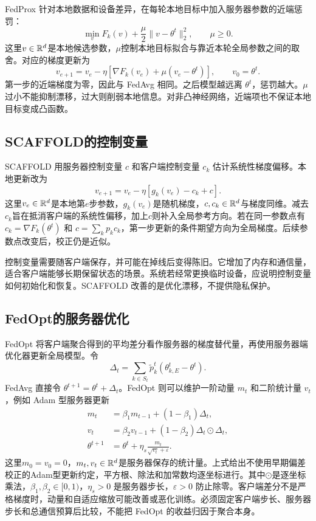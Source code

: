 FedProx 针对本地数据和设备差异，在每轮本地目标中加入服务器参数的近端惩罚\cite{li2020fedprox}：
\begin{equation}
 \min_v F_k(v)+\frac{\mu}{2}\|v-\theta^t\|_2^2,
 \qquad \mu\geq0.
 \label{eq:fedprox-objective-rewrite}
\end{equation}
这里$v\in\mathbb{R}^d$是本地候选参数，$\mu$控制本地目标拟合与靠近本轮全局参数之间的取舍。对应的梯度更新为
\begin{equation}
 v_{e+1}=v_e-\eta[\nabla F_k(v_e)+\mu(v_e-\theta^t)],
 \qquad v_0=\theta^t.
\end{equation}
第一步的近端梯度为零，因此与 FedAvg 相同。之后模型越远离 $\theta^t$，惩罚越大。$\mu$ 过小不能抑制漂移，过大则削弱本地信息。对非凸神经网络，近端项也不保证本地目标变成凸函数。

\subsection{SCAFFOLD的控制变量}

SCAFFOLD 用服务器控制变量 $c$ 和客户端控制变量 $c_k$ 估计系统性梯度偏移\cite{karimireddy2020scaffold}。本地更新改为
\begin{equation}
 v_{e+1}=v_e-\eta[g_k(v_e)-c_k+c].
 \label{eq:scaffold-update-rewrite}
\end{equation}
这里$v_e\in\mathbb{R}^d$是本地第$e$步参数，$g_k(v_e)$是随机梯度，$c,c_k\in\mathbb{R}^d$与梯度同维。减去$c_k$旨在抵消客户端的系统性偏移，加上$c$则补入全局参考方向。若在同一参数点有 $c_k=\nabla F_k(\theta^t)$ 和 $c=\sum_kp_kc_k$，第一步更新的条件期望方向为全局梯度。后续参数点改变后，校正仍是近似。

控制变量需要随客户端保存，并可能在掉线后变得陈旧。它增加了内存和通信量，适合客户端能够长期保留状态的场景。系统若经常更换临时设备，应说明控制变量如何初始化和恢复。SCAFFOLD 改善的是优化漂移，不提供隐私保护。

\subsection{FedOpt的服务器优化}

FedOpt 将客户端聚合得到的平均差分看作服务器的梯度替代量，再使用服务器端优化器更新全局模型\cite{reddi2021adaptive}。令
\begin{equation}
 \Delta_t=\sum_{k\in S_t}\widetilde p_k^t(\theta_{k,E}^t-\theta^t).
\end{equation}
FedAvg 直接令 $\theta^{t+1}=\theta^t+\Delta_t$。FedOpt 则可以维护一阶动量 $m_t$ 和二阶统计量 $v_t$，例如 Adam 型服务器更新
\begin{align}
 m_t&=\beta_1m_{t-1}+(1-\beta_1)\Delta_t,\\
 v_t&=\beta_2v_{t-1}+(1-\beta_2)\Delta_t\odot\Delta_t,\\
 \theta^{t+1}&=\theta^t+\eta_s\frac{m_t}{\sqrt{v_t}+\varepsilon}.
 \end{align}
这里$m_0=v_0=0$，$m_t,v_t\in\mathbb{R}^d$是服务器保存的统计量。上式给出不使用早期偏差校正的Adam型更新约定，平方根、除法和加常数均逐坐标进行。其中$\odot$是逐坐标乘法，$\beta_1,\beta_2\in[0,1)$，$\eta_s>0$ 是服务器步长，$\varepsilon>0$ 防止除零。客户端差分不是严格梯度时，动量和自适应缩放可能改善或恶化训练。必须固定客户端步长、服务器步长和总通信预算后比较，不能把 FedOpt 的收益归因于聚合本身。

